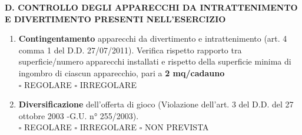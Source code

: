 \documentclass[12pt]{article}
\begin{document}
\begin{center}
    \textbf{D. CONTROLLO DEGLI APPARECCHI DA INTRATTENIMENTO E DIVERTIMENTO PRESENTI NELL’ESERCIZIO}
\end{center}
\begin{enumerate}[resume]
    \item \textbf{Contingentamento} apparecchi da divertimento e intrattenimento (art. 4 comma 1 del D.D. 27/07/2011). Verifica rispetto rapporto tra superficie/numero apparecchi installati e rispetto della superficie minima di ingombro di ciascun apparecchio, pari a \textbf{2 mq/cadauno }
    \\\begin{math} \square\end{math} REGOLARE \begin{math}\square\end{math} IRREGOLARE
    \item \textbf{Diversificazione} dell’offerta di gioco (Violazione dell’art. 3 del D.D. del 27 ottobre 2003 -G.U. n° 255/2003).
    \\\begin{math} \square\end{math} REGOLARE \begin{math}\square\end{math} IRREGOLARE \begin{math}\square\end{math} NON PREVISTA
\end{enumerate}
\end{document}
